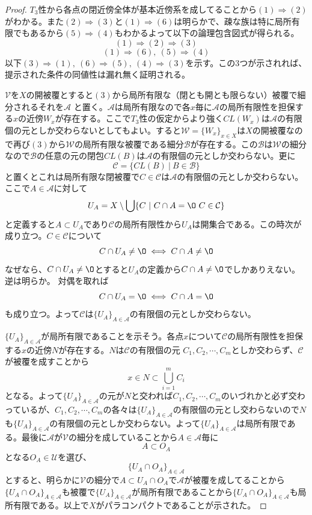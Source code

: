 \documentclass[leqno]{jsarticle}
\newcommand{\To}{\Longrightarrow}
\begin{document}
\begin{proof}
$T_3$性から各点の閉近傍全体が基本近傍系を成してることから$(1)\To (2)$がわかる。また$(2)\To (3)$と$(1)\To (6)$は明らかで、疎な族は特に局所有限でもあるから$(5)\To (4)$もわかるよって以下の論理包含図式が得られる。
\[
(1)\To (2)\To (3)
\]
\[
(1)\To (6),\ (5)\To (4)
\]
以下$(3)\To (1),\ (6)\To(5),\ (4)\To (3)$を示す。この3つが示されれば、提示された条件の同値性は漏れ無く証明される。\par
[$(3)\To (1)$の証明]\par
$\mathcal{V}$を$X$の開被覆とすると$(3)$から局所有限な（閉とも開とも限らない）被覆で細分されるそれを$\mathcal{A}$
と置く。$\mathcal{A}$は局所有限なので各$x$毎に$\mathcal{A}$の局所有限性を担保する$x$の近傍$W_x$が存在する。ここで$T_3$性の仮定からより強く$CL(W_x)$は$\mathcal{A}$の有限個の元としか交わらないとしてもよい。すると$\mathcal{W}=\{W_x\}_{x\in X}$は$X$の開被覆なので再び$(3)$から$\mathcal{W}$の局所有限な被覆である細分$\mathcal{B}$が存在する。この$\mathcal{B}$は$\mathcal{W}$の細分なので$\mathcal{B}$の任意の元の閉包$CL(B)$は$\mathcal{A}$の有限個の元としか交わらない。更に
\[
\mathcal{C}=\{CL(B)\ |\ B\in \mathcal{B}\}
\]
と置くとこれは局所有限な閉被覆で$C\in\mathcal{C}$は$\mathcal{A}$の有限個の元としか交わらない。
ここで$A\in \mathcal{A}$に対して
\[
U_A=X\setminus \bigcup\{C\ |\ C\cap A=\O\ C\in \mathcal{C}\}
\]
と定義すると$A\subset U_A$であり$\mathcal{C}$の局所有限性から$U_A$は開集合である。この時次が成り立つ。$C\in \mathcal{C}$について
\[
C\cap U_A\neq\O \iff C\cap A\neq\O
\]
なぜなら、$C\cap U_A\neq\O$とすると$U_A$の定義から$C\cap A\neq \O$でしかありえない。逆は明らか。
対偶を取れば
\[
C\cap U_A=\O \iff C\cap A=\O
\]
も成り立つ。よって$\mathcal{C}$は$\{U_A\}_{A\in \mathcal{A}}$の有限個の元としか交わらない。\par
$\{U_A\}_{A\in \mathcal{A}}$が局所有限であることを示そう。各点$x$について$\mathcal{C}$の局所有限性を担保する$x$の近傍$N$が存在する。$N$は$\mathcal{C}$の有限個の元
$C_1,C_2,\cdots ,C_m$としか交わらず、$\mathcal{C}$が被覆を成すことから
\[
x\in N\subset \bigcup_{i=1}^mC_i
\]
となる。よって$\{U_A\}_{A\in \mathcal{A}}$の元が$N$と交われば$C_1,C_2,\cdots ,C_m$のいづれかと必ず交わっているが、$C_1,C_2,\cdots ,C_m$の各々は$\{U_A\}_{A\in \mathcal{A}}$の有限個の元とし交わらないので$N$も$\{U_A\}_{A\in \mathcal{A}}$の有限個の元としか交わらない。よって$\{U_A\}_{A\in \mathcal{A}}$は局所有限である。最後に$\mathcal{A}$が$\mathcal{V}$の細分を成していることから$A\in \mathcal{A}$毎に
\[
A\subset O_A 
\]
となる$O_A\in \mathcal{U}$を選び、
\[
\{U_A\cap O_A\}_{A\in \mathcal{A}}
\]
とすると、明らかに$\mathcal{V}$の細分で$A\subset U_A\cap O_A$で$\mathcal{A}$が被覆を成してることから$\{U_A\cap O_A\}_{A\in \mathcal{A}}$も被覆で$\{U_A\}_{A\in \mathcal{A}}$が局所有限であることから$\{U_A\cap O_A\}_{A\in \mathcal{A}}$も局所有限である。以上で$X$がパラコンパクトであることが示された。

\end{proof}
\end{document}
